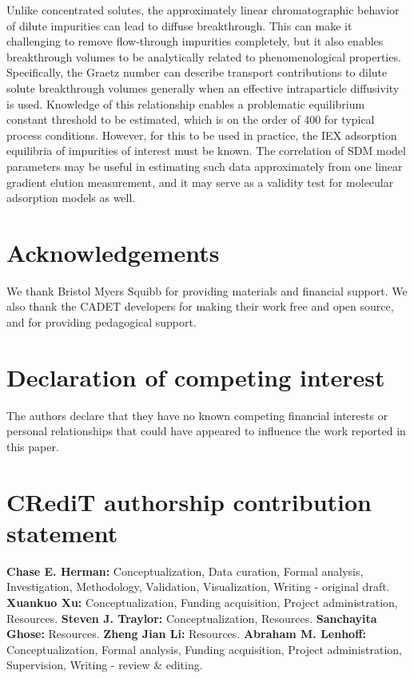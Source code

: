 \documentclass[preprint,review,12pt]{elsarticle}
\begin{document}
    Unlike concentrated solutes, the approximately linear chromatographic behavior of dilute impurities can lead to diffuse breakthrough. This can make it challenging to remove flow-through impurities completely, but it also enables breakthrough volumes to be analytically related to phenomenological properties. Specifically, the Graetz number can describe transport contributions to dilute solute breakthrough volumes generally when an effective intraparticle diffusivity is used. Knowledge of this relationship enables a problematic equilibrium constant threshold to be estimated, which is on the order of 400 for typical process conditions. However, for this to be used in practice, the IEX adsorption equilibria of impurities of interest must be known. The correlation of SDM model parameters may be useful in estimating such data approximately from one linear gradient elution measurement, and it may serve as a validity test for molecular adsorption models as well.


\section*{Acknowledgements}
    We thank Bristol Myers Squibb for providing materials and financial support. We also thank the CADET developers for making their work free and open source, and for providing pedagogical support.

\section*{Declaration of competing interest}
    The authors declare that they have no known competing financial interests or personal relationships that could have appeared to influence the work reported in this paper.

\section*{CRediT authorship contribution statement}
    \textbf{Chase E. Herman:} Conceptualization, Data curation, Formal analysis, Investigation, Methodology, Validation, Visualization, Writing - original draft.
    \textbf{Xuankuo Xu:} Conceptualization, Funding acquisition, Project administration, Resources.
    \textbf{Steven J. Traylor:} Conceptualization, Resources.
    \textbf{Sanchayita Ghose:} Resources.
    \textbf{Zheng Jian Li:} Resources.
    \textbf{Abraham M. Lenhoff:} Conceptualization, Formal analysis, Funding acquisition, Project administration, Supervision, Writing - review \& editing.
\end{document}
